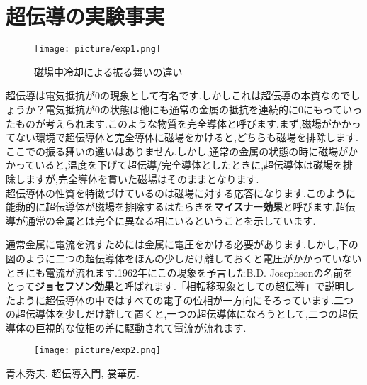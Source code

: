 \documentclass[12pt, a3j, dvipdfmx, jis2004]{jsarticle}
\begin{document}
\section*{超伝導の実験事実}
\begin{tcbraster}[raster columns = 1]
	\begin{tcolorbox}[title = マイスナー効果]
		\begin{wrapfigure}{r}[0pt]{0.35\linewidth}
			\centering
			\vspace{-2zh}
			\texttt{[image: picture/exp1.png]}
			\caption{磁場中冷却による振る舞いの違い}
			\end{wrapfigure}
		超伝導は電気抵抗が$0$の現象として有名です.しかしこれは超伝導の本質なのでしょうか？電気抵抗が$0$の状態は他にも通常の金属の抵抗を連続的に$0$にもっていったものが考えられます.このような物質を完全導体と呼びます.まず,磁場がかかってない環境で超伝導体と完全導体に磁場をかけると,どちらも磁場を排除します.ここでの振る舞いの違いはありません.しかし,通常の金属の状態の時に磁場がかかっていると,温度を下げて超伝導/完全導体としたときに,超伝導体は磁場を排除しますが,完全導体を貫いた磁場はそのままとなります.\\
		超伝導体の性質を特徴づけているのは磁場に対する応答になります.このように能動的に超伝導体が磁場を排除するはたらきを\textbf{マイスナー効果}と呼びます.超伝導が通常の金属とは完全に異なる相にいるということを示しています.
	\end{tcolorbox}

	\begin{tcolorbox}[title = ジョセフソン効果]
		通常金属に電流を流すためには金属に電圧をかける必要があります.しかし,下の図のように二つの超伝導体をほんの少しだけ離しておくと電圧がかかっていないときにも電流が流れます.1962年にこの現象を予言したB.D. Josephsonの名前をとって\textbf{ジョセフソン効果}と呼ばれます.「相転移現象としての超伝導」で説明したように超伝導体の中ではすべての電子の位相が一方向にそろっています.二つの超伝導体を少しだけ離して置くと,一つの超伝導体になろうとして,二つの超伝導体の巨視的な位相の差に駆動されて電流が流れます.
		\begin{figure}[H]
			\centering
			\texttt{[image: picture/exp2.png]}
		\end{figure}
	\end{tcolorbox}

	\begin{tcolorbox}[title = 超伝導に関する参考文献]
		\begin{thebibliography}{99}
			\bibitem  青木秀夫, 超伝導入門, 裳華房.
		\end{thebibliography}
		\end{tcolorbox}
\end{tcbraster}
\end{document}
